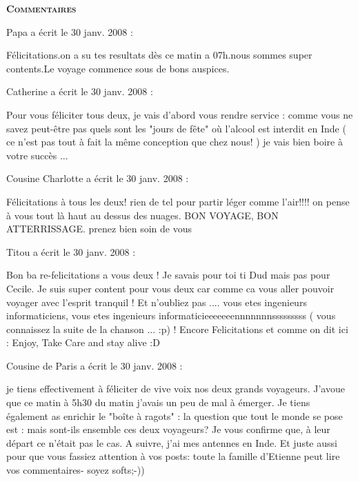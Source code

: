\bigskip
\textbf{\textsc{Commentaires}}

 \medskip
Papa a écrit le 30 janv. 2008 :
\begin{displayquote}
Félicitations.on a su tes resultats dès ce matin a 07h.nous sommes super contents.Le voyage commence sous de bons auspices.
\end{displayquote}

 \medskip
Catherine a écrit le 30 janv. 2008 :
\begin{displayquote}
Pour vous féliciter tous deux, je vais d'abord vous rendre service : comme vous ne savez peut-être pas quels sont les "jours de fête" où l'alcool est interdit en Inde ( ce n'est pas tout à fait la même conception que chez nous! ) je vais bien boire à votre succès ...
\end{displayquote}

 \medskip
Cousine Charlotte a écrit le 30 janv. 2008 :
\begin{displayquote}
Félicitations à tous les deux! rien de tel pour partir léger comme l'air!!!! on pense à vous tout là haut au dessus des nuages. BON VOYAGE, BON ATTERRISSAGE. prenez bien soin de vous
\end{displayquote}

 \medskip
Titou a écrit le 30 janv. 2008 :
\begin{displayquote}
Bon ba re-felicitations a vous deux ! Je savais pour toi ti Dud mais pas pour Cecile. Je suis super content pour vous deux car comme ca vous aller pouvoir voyager avec l'esprit tranquil ! Et n'oubliez pas .... vous etes ingenieurs informaticiens, vous etes ingenieurs informaticieeeeeeennnnnnnsssssssss ( vous connaissez la suite de la chanson ... :p) ! Encore Felicitations et comme on dit ici : Enjoy, Take Care and stay alive :D
\end{displayquote}

 \medskip
Cousine de Paris a écrit le 30 janv. 2008 :
\begin{displayquote}
je tiens effectivement à féliciter de vive voix nos deux grands voyageurs. J'avoue que ce matin à 5h30 du matin j'avais un peu de mal à émerger. 
Je tiens également as enrichir le "boîte à ragots" : la question que tout le monde se pose est : mais sont-ils ensemble ces deux voyageurs? Je vous confirme que, à leur départ ce n'était pas le cas. A suivre, j'ai mes antennes en Inde. 
Et juste aussi pour que vous fassiez attention à vos posts: toute la famille d'Etienne peut lire vos commentaires- soyez softs;-))
\end{displayquote}

